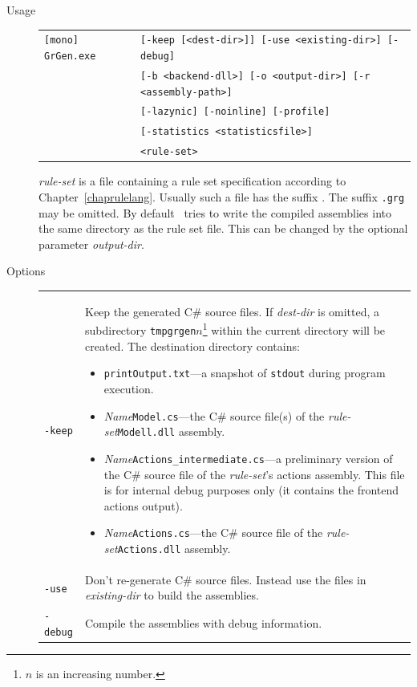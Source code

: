 \begin{description}
  \item[Usage] \begin{tabular*}{\linewidth}{@{}l@{}l}\texttt{[mono] GrGen.exe } & \texttt{[-keep [<dest-dir>]] [-use <existing-dir>] [-debug]}\\
        &\texttt{[-b <backend-dll>] [-o <output-dir>] [-r <assembly-path>]}\\
        &\texttt{[-lazynic] [-noinline] [-profile]}\\
        &\texttt{[-statistics <statisticsfile>]}\\
        &\texttt{<rule-set>}\end{tabular*}
    \emph{rule-set} is a file containing a rule set specification according to Chapter~\ref{chaprulelang}. Usually such a file has the suffix \texttt{}. The suffix \texttt{.grg} may be omitted.
By default \GrG\ tries to write the compiled assemblies into the same directory as the rule set file. This can be changed by the optional parameter \emph{output-dir}.
  \item[Options] \mbox{}
    \begin{tabularx}{\linewidth}{lX}
      \texttt{-keep} & Keep the generated C\# source files. If \emph{dest-dir} is omitted, a subdirectory \texttt{tmpgrgen$n$}\footnote{$n$ is an increasing number.} within the current directory will be created. The destination directory contains:
\begin{itemize}
  \item \texttt{printOutput.txt}---a snapshot of \texttt{stdout} during program execution.
  \item \emph{Name}\texttt{Model.cs}---the C\# source file(s) of the \emph{rule-set}\texttt{Modell.dll} assembly.
  \item \emph{Name}\texttt{Actions\_intermediate.cs}---a preliminary version of the C\# source file of the \emph{rule-set}'s actions assembly.
	This file is for internal debug purposes only (it contains the frontend actions output).
  \item \emph{Name}\texttt{Actions.cs}---the C\# source file of the \emph{rule-set}\texttt{Actions.dll} assembly.
\end{itemize}\\
      \texttt{-use} & Don't re-generate C\# source files. Instead use the files in \emph{existing-dir} to build the assemblies.\\
      \texttt{-debug} & Compile the assemblies with debug information.\\

\end{tabularx}
\end{description}
